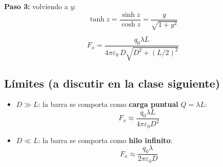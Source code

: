 \documentclass[12pt,a4paper]{article}
\begin{document}
\textbf{Paso 3:} volviendo a $y$:
\[
\tanh z = \frac{\sinh z}{\cosh z}
        = \frac{y}{\sqrt{1 + y^{2}}}
\]

\begin{keybox}
  \[
  \boxed{
  F_x = \frac{q_0 \lambda L}
             {4\pi\varepsilon_0 \,
              D \sqrt{D^{2} + (L/2)^{2}}}
  }
  \]
\end{keybox}

\subsection{Límites (a discutir en la clase siguiente)}

\begin{itemize}[nosep]
  \item \textbf{$D \gg L$}: la barra se comporta como
        \textbf{carga puntual} $Q = \lambda L$:
        \[
        F_x \approx \frac{q_0 \lambda L}{4\pi\varepsilon_0 D^{2}}
        \]
  \item \textbf{$D \ll L$}: la barra se comporta como
        \textbf{hilo infinito}:
        \[
        F_x \approx \frac{q_0 \lambda}{2\pi\varepsilon_0 D}
        \]
\end{itemize}
\end{document}
